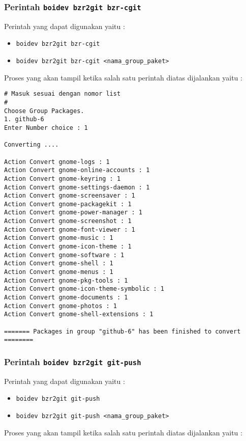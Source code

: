 {\subsubsection{Perintah {\small \texttt{boidev bzr2git bzr-cgit}}}
\noindent
Perintah yang dapat digunakan yaitu :
\begin{itemize}
	\item {\small \texttt{boidev bzr2git bzr-cgit}}
	\item {\small \texttt{boidev bzr2git bzr-cgit <nama\_group\_paket>}}
\end{itemize}

\noindent
Proses yang akan tampil ketika salah satu perintah diatas dijalankan yaitu :

\begin{lstlisting}[language=ShellBash2]
# Masuk sesuai dengan nomor list
#
Choose Group Packages.
1. github-6
Enter Number choice : 1

Converting .... 

Action Convert gnome-logs : 1
Action Convert gnome-online-accounts : 1
Action Convert gnome-keyring : 1
Action Convert gnome-settings-daemon : 1
Action Convert gnome-screensaver : 1
Action Convert gnome-packagekit : 1
Action Convert gnome-power-manager : 1
Action Convert gnome-screenshot : 1
Action Convert gnome-font-viewer : 1
Action Convert gnome-music : 1
Action Convert gnome-icon-theme : 1
Action Convert gnome-software : 1
Action Convert gnome-shell : 1
Action Convert gnome-menus : 1
Action Convert gnome-pkg-tools : 1
Action Convert gnome-icon-theme-symbolic : 1
Action Convert gnome-documents : 1
Action Convert gnome-photos : 1
Action Convert gnome-shell-extensions : 1

======= Packages in group "github-6" has been finished to convert ========
\end{lstlisting}

\subsubsection{Perintah {\small \texttt{boidev bzr2git git-push}}}
\noindent
Perintah yang dapat digunakan yaitu :
\begin{itemize}
	\item {\small \texttt{boidev bzr2git git-push}}
	\item {\small \texttt{boidev bzr2git git-push <nama\_group\_paket>}}
\end{itemize}

\noindent
Proses yang akan tampil ketika salah satu perintah diatas dijalankan yaitu :

}
